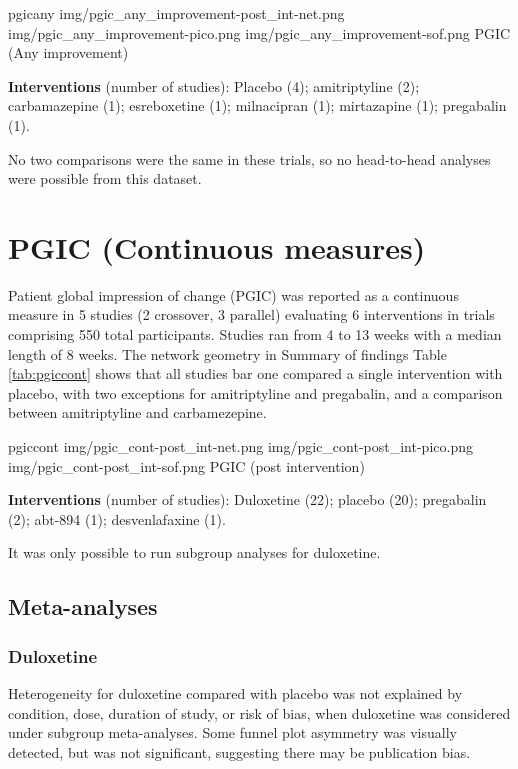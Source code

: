 \documentclass{report}\usepackage[]{graphicx}\usepackage[]{color}
\begin{document}
\soffignew
{pgicany}
{img/pgic_any_improvement-post_int-net.png}
{img/pgic_any_improvement-pico.png}
{img/pgic_any_improvement-sof.png}
{PGIC (Any improvement)}

\textbf{Interventions} (number of studies): Placebo (4); amitriptyline (2); carbamazepine (1); esreboxetine (1); milnacipran (1); mirtazapine (1); pregabalin (1).

No two comparisons were the same in these trials, so no head-to-head analyses were possible from this dataset.

\section{PGIC (Continuous measures)}

Patient global impression of change (PGIC) was reported as a continuous measure in 5 studies (2 crossover, 3 parallel) evaluating 6 interventions in trials comprising 550 total participants. Studies ran from 4 to 13 weeks with a median length of 8 weeks. The network geometry in Summary of findings Table \ref{tab:pgiccont} shows that all studies bar one compared a single intervention with placebo, with two exceptions for amitriptyline and pregabalin, and a comparison between amitriptyline and carbamezepine.

\soffignew
{pgiccont}
{img/pgic_cont-post_int-net.png}
{img/pgic_cont-post_int-pico.png}
{img/pgic_cont-post_int-sof.png}
{PGIC (post intervention)}

\textbf{Interventions} (number of studies): Duloxetine (22); placebo (20); pregabalin (2); abt-894 (1); desvenlafaxine (1).

It was only possible to run subgroup analyses for duloxetine.

\subsection{Meta-analyses}

\subsubsection{Duloxetine}

Heterogeneity for duloxetine compared with placebo was not explained by condition, dose, duration of study, or risk of bias, when duloxetine was considered under subgroup meta-analyses. Some funnel plot asymmetry was visually detected, but was not significant, suggesting there may be publication bias.
\end{document}
